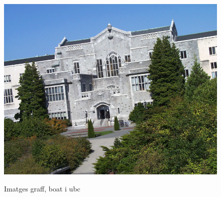 \begin{figure}[!htb]
				\label{fig:awesome_image2}
			\endminipage\hfill
				\includegraphics[width=\linewidth]{images/experiments/ubc}
				\label{fig:awesome_image3}
			\endminipage
			\caption{Imatges graff, boat i ubc}
		\end{figure}

